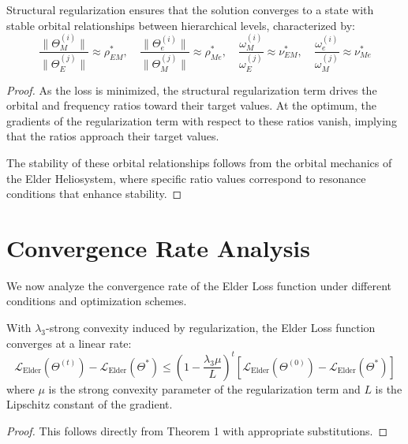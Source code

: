 \begin{theorem}
Structural regularization ensures that the solution converges to a state with stable orbital relationships between hierarchical levels, characterized by:
\begin{equation}
\frac{\|\Theta_M^{(i)}\|}{\|\Theta_E^{(j)}\|} \approx \rho_{EM}^*, \quad \frac{\|\Theta_e^{(i)}\|}{\|\Theta_M^{(j)}\|} \approx \rho_{Me}^*, \quad \frac{\omega_M^{(i)}}{\omega_E^{(j)}} \approx \nu_{EM}^*, \quad \frac{\omega_e^{(i)}}{\omega_M^{(j)}} \approx \nu_{Me}^*
\end{equation}
\end{theorem}

\begin{proof}
As the loss is minimized, the structural regularization term drives the orbital and frequency ratios toward their target values. At the optimum, the gradients of the regularization term with respect to these ratios vanish, implying that the ratios approach their target values.

The stability of these orbital relationships follows from the orbital mechanics of the Elder Heliosystem, where specific ratio values correspond to resonance conditions that enhance stability.
\end{proof}

\section{Convergence Rate Analysis}

We now analyze the convergence rate of the Elder Loss function under different conditions and optimization schemes.

\begin{theorem}
With $\lambda_3$-strong convexity induced by regularization, the Elder Loss function converges at a linear rate:
\begin{equation}
\mathcal{L}_{\text{Elder}}(\Theta^{(t)}) - \mathcal{L}_{\text{Elder}}(\Theta^*) \leq \left(1 - \frac{\lambda_3 \mu}{L}\right)^t [\mathcal{L}_{\text{Elder}}(\Theta^{(0)}) - \mathcal{L}_{\text{Elder}}(\Theta^*)]
\end{equation}
where $\mu$ is the strong convexity parameter of the regularization term and $L$ is the Lipschitz constant of the gradient.
\end{theorem}

\begin{proof}
This follows directly from Theorem 1 with appropriate substitutions.
\end{proof}

